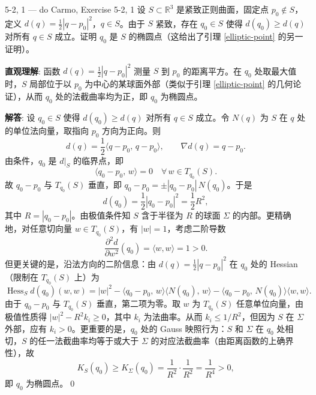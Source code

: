 \begin{exercise}{5-2, 1 — do Carmo, Exercise 5-2, 1}
设 $S \subset \mathbb{R}^3$ 是紧致正则曲面，固定点 $p_0 \notin S$，定义 $d(q) = \frac{1}{2}|q-p_0|^2$，$q\in S$。由于 $S$ 紧致，存在 $q_0 \in S$ 使得 $d(q_0) \geq d(q)$ 对所有 $q \in S$ 成立。证明 $q_0$ 是 $S$ 的椭圆点（这给出了引理 \ref{elliptic-point} 的另一证明）。
\end{exercise}
\begin{solution}
\textbf{直观理解}: 函数 $d(q) = \frac{1}{2}|q-p_0|^2$ 测量 $S$ 到 $p_0$ 的距离平方。在 $q_0$ 处取最大值时，$S$ 局部位于以 $p_0$ 为中心的某球面外部（类似于引理 \ref{elliptic-point} 的几何论证），从而 $q_0$ 处的法截曲率均为正，即 $q_0$ 为椭圆点。

\textbf{解答}: 设 $q_0 \in S$ 使得 $d(q_0) \geq d(q)$ 对所有 $q \in S$ 成立。令 $N(q)$ 为 $S$ 在 $q$ 处的单位法向量，取指向 $p_0$ 方向为正向。则
\[
d(q) = \frac{1}{2}\langle q-p_0,\, q-p_0\rangle,\qquad
\nabla d(q) = q - p_0.
\]
由条件，$q_0$ 是 $d|_S$ 的临界点，即
\[
\langle q_0-p_0,\, w\rangle = 0\quad\forall\, w\in T_{q_0}(S).
\]
故 $q_0-p_0$ 与 $T_{q_0}(S)$ 垂直，即 $q_0-p_0 = \pm |q_0-p_0|\,N(q_0)$。于是
\[
d(q_0) = \frac{1}{2}|q_0-p_0|^2 = \frac{1}{2}R^2,
\]
其中 $R = |q_0-p_0|$。由极值条件知 $S$ 含于半径为 $R$ 的球面 $\Sigma$ 的内部。更精确地，对任意切向量 $w \in T_{q_0}(S)$，有 $|w|=1$，考虑二阶导数
\[
\frac{\partial^2 d}{\partial w^2}(q_0) = \langle w,w\rangle = 1 > 0.
\]
但更关键的是，沿法方向的二阶信息：由 $d(q) = \frac{1}{2}|q-p_0|^2$ 在 $q_0$ 处的 Hessian（限制在 $T_{q_0}(S)$ 上）为
\[
\operatorname{Hess}_S d(q_0)(w,w) = |w|^2 - \langle q_0-p_0,\, w\rangle\langle N(q_0),\, w\rangle - \langle q_0-p_0,\, N(q_0)\rangle\langle w,w\rangle.
\]
由于 $q_0-p_0$ 与 $T_{q_0}(S)$ 垂直，第二项为零。取 $w$ 为 $T_{q_0}(S)$ 任意单位向量，由极值性质得 $|w|^2 - R^2 k_i \geq 0$，其中 $k_i$ 为法曲率。从而 $k_i \leq 1/R^2$，但因为 $S$ 在 $\Sigma$ 外部，应有 $k_i > 0$。更重要的是，$q_0$ 处的 Gauss 映照行为：$S$ 和 $\Sigma$ 在 $q_0$ 处相切，$S$ 的任一法截曲率均等于或大于 $\Sigma$ 的对应法截曲率（由距离函数的上确界性），故
\[
K_S(q_0) \geq K_\Sigma(q_0) = \frac{1}{R^2}\cdot\frac{1}{R^2} = \frac{1}{R^4} > 0,
\]
即 $q_0$ 为椭圆点。\qed
\end{solution}

